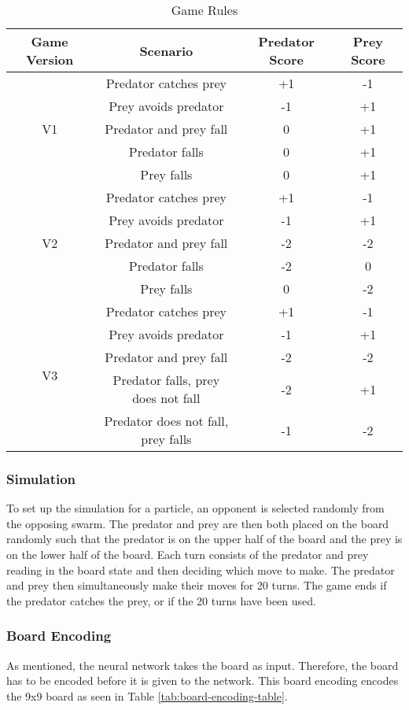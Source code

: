 \begin{table}
  \centering
  \begin{tabular}{|c|c|c|c|}
    \hline
    Game Version & Scenario & Predator Score & Prey Score\\
    \hline
    \multirow{ 5}{*}{V1} & Predator catches prey & +1 & -1 \\
    & Prey avoids predator & -1 & +1\\ 
    & Predator and prey fall & 0 & +1 \\
    & Predator falls & 0 & +1 \\
    & Prey falls & 0 & +1 \\
    \hline
    \multirow{ 5}{*}{V2} & Predator catches prey& +1 & -1\\
    & Prey avoids predator & -1 & +1\\ 
    & Predator and prey fall & -2 & -2 \\
    & Predator falls & -2 & 0 \\
    & Prey falls & 0 & -2 \\
    \hline
    \multirow{ 5}{*}{V3} &  Predator catches prey & +1 & -1\\
    & Prey avoids predator & -1 & +1\\
    & Predator and prey fall & -2 & -2\\
    & Predator falls, prey does not fall & -2 & +1 \\
    & Predator does not fall, prey falls & -1 & -2 \\
    \hline
  \end{tabular}
  \caption{Game Rules}
  \label{tab:game-rules}
\end{table}

\subsubsection{Simulation}
To set up the simulation for a particle, an opponent is selected randomly from the opposing swarm. The predator and prey are then both placed on the board randomly such that the predator is on the upper half of the board and the prey is on the lower half of the board. Each turn consists of the predator and prey reading in the board state and then deciding which move to make. The predator and prey then simultaneously make their moves for 20 turns. The game ends if the predator catches the prey, or if the 20 turns have been used. 

\subsubsection{Board Encoding}
As mentioned, the neural network takes the board as input. Therefore, the board has to be encoded before it is given to the network. This board encoding encodes the 9x9 board as seen in Table \ref{tab:board-encoding-table}.

